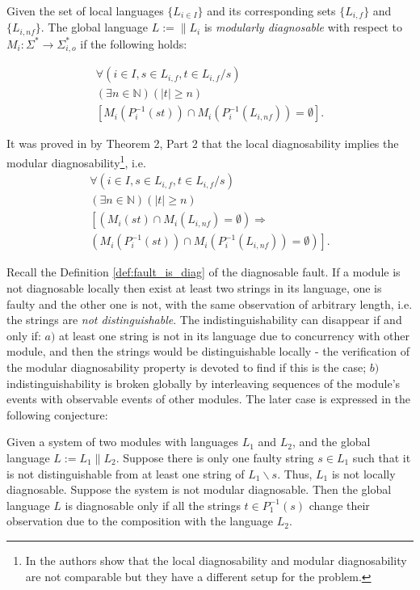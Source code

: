 \begin{definition} Given the set of local languages
$\{L_{i \in I}\}$ and its corresponding sets $\{L_{i,f}\}$ and
$\{L_{i,nf}\}$. The global language $L := \parallel L_i$ is \emph{modularly
diagnosable} with respect to
$M_i: \Sigma^* \rightarrow \Sigma_{i,o}^*$ 
if the following holds:
\end{definition}
\begin{equation}
\begin{array}{l}
	\forall(i \in I, s \in L_{i,f}, t \in L_{i,f}/s)
	\\
	(\exists n \in \mathbb{N})
	(|t| \geq n)
	\\
	\left[ M_i(P_i^{-1}(st)) \cap M_i(P_i^{-1}(L_{i,nf})) = \emptyset \right].
\end{array}
\end{equation}

It was proved in \cite{contant_diagnosability_2006} by Theorem 2, Part 2 
that the local diagnosability implies the modular diagnosability\footnote{In
\cite{zhou_decentralized_2008} the authors show that the local diagnosability
and modular diagnosability are not comparable but they have a different setup
for the problem.}, i.e.
\begin{equation}
\begin{array}{l}
	\forall(i \in I, s \in L_{i,f}, t \in L_{i,f}/s)
	\\
	(\exists n \in \mathbb{N})
	(|t| \geq n)
	\\
	\left[
	\left( M_i(st) \cap M_i(L_{i,nf}) = \emptyset \right)
	\Rightarrow \right.
	\\ 
	\left.
	\left( M_i(P_i^{-1}(st)) \cap M_i(P_i^{-1}(L_{i,nf})) = \emptyset \right)
	\right].
\end{array}
\end{equation}


Recall the Definition \ref{def:fault_is_diag} of the diagnosable fault. If a
module is not diagnosable locally then exist at least two strings in its
language, one is faulty and the other one is not, with the same observation of
arbitrary length, i.e. the strings are \emph{not distinguishable}. The
indistinguishability can disappear if and only if:
$a)$ at least one string is not in its language due to concurrency with other
module, and then the strings would be distinguishable locally - the verification
of the modular diagnosability property is devoted to find if this is the case;
$b)$ indistinguishability is broken globally by interleaving sequences of the
module's events with observable events of other modules. The later case is
expressed in the following conjecture:
\begin{conjecture} Given a system of two modules with languages $L_1$ and $L_2$,
and the global language $L := L_1 \parallel L_2$. Suppose there is only
one faulty string $s \in L_1$ such that it is not distinguishable from at least one
string of $L_1\backslash s$. Thus, $L_1$ is not locally diagnosable. Suppose the
system is not modular diagnosable. Then the global language $L$ is diagnosable
only if all the strings $t \in P_1^{-1}(s)$ change their observation due to 
the composition with the language $L_2$.
\end{conjecture}

